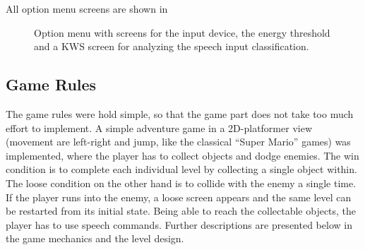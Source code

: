 All option menu screens are shown in 
\begin{figure}[!ht]
  \centering
  \qquad
  \qquad
  \caption{Option menu with screens for the input device, the energy threshold and a KWS screen for analyzing the speech input classification.}
  \label{fig:game_design_menu_options}
\end{figure}
\FloatBarrier
\noindent



\subsection{Game Rules}\label{sec:game_design_rules}
The game rules were hold simple, so that the game part does not take too much effort to implement.
A simple adventure game in a 2D-platformer view (movement are left-right and jump, like the classical \enquote{Super Mario} games) was implemented, where the player has to collect objects and dodge enemies.
The win condition is to complete each individual level by collecting a single object within. 
The loose condition on the other hand is to collide with the enemy a single time.
If the player runs into the enemy, a loose screen appears and the same level can be restarted from its initial state.
Being able to reach the collectable objects, the player has to use speech commands.
Further descriptions are presented below in the game mechanics and the level design.



